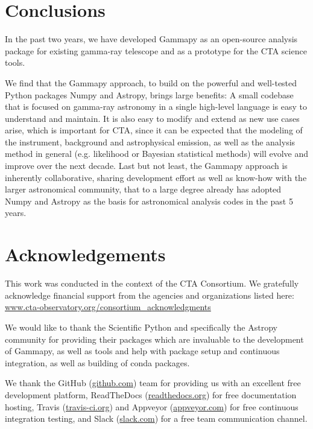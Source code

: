 \documentclass{PoS}
\newcommand{\urlCtaAck}{\href{http://www.cta-observatory.org/consortium_acknowledgments}{www.cta-observatory.org/consortium\_acknowledgments}}
\newcommand{\urlGithub}{\href{https://github.com}{github.com}}
\newcommand{\urlRtd}{\href{https://readthedocs.org}{readthedocs.org}}
\newcommand{\urlTravis}{\href{https://travis-ci.org}{travis-ci.org}}
\newcommand{\urlAppveyor}{\href{https://appveyor.com}{appveyor.com}}
\newcommand{\urlSlack}{\href{https://slack.com}{slack.com}}
\begin{document}
\section{Conclusions}
\label{sec:conclusions}

In the past two years, we have developed Gammapy as an open-source analysis
package for existing gamma-ray telescope and as a prototype for the CTA science
tools.

We find that the Gammapy approach, to build on the powerful and well-tested
Python packages Numpy and Astropy, brings large benefits: A small codebase that
is focused on gamma-ray astronomy in a single high-level language is easy to
understand and maintain. It is also easy to modify and extend as new use cases
arise, which is important for CTA, since it can be expected that the modeling of
the instrument, background and astrophysical emission, as well as the analysis
method in general (e.g. likelihood or Bayesian statistical methods) will evolve
and improve over the next decade. Last but not least, the Gammapy approach is
inherently collaborative, sharing development effort as well as know-how with
the larger astronomical community, that to a large degree already has adopted
Numpy and Astropy as the basis for astronomical analysis codes in the past 5
years.

\section{Acknowledgements}
\label{sed:acknowledgements}

This work was conducted in the context of the CTA Consortium. We gratefully
acknowledge financial support from the agencies and organizations listed here:\\
\urlCtaAck

We would like to thank the Scientific Python and specifically the Astropy
community for providing their packages which are invaluable to the development
of Gammapy, as well as tools and help with package setup and continuous
integration, as well as building of conda packages.

We thank the GitHub (\urlGithub) team for providing us with an excellent free
development platform, ReadTheDocs (\urlRtd) for free documentation hosting,
Travis (\urlTravis) and Appveyor (\urlAppveyor) for free continuous integration
testing, and Slack (\urlSlack) for a free team communication channel.



\end{document}
